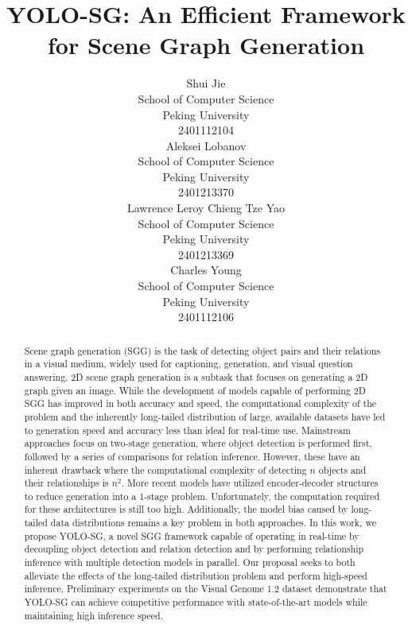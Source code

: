 \documentclass{article}
\title{YOLO-SG: An Efficient Framework for Scene Graph Generation}
\author{
  Shui Jie \\
  School of Computer Science\\
  Peking University\\
  2401112104 \\
  \And
  Aleksei Lobanov \\
  School of Computer Science\\
  Peking University\\
  2401213370  \\
  \AND
  Lawrence Leroy Chieng Tze Yao \\
  School of Computer Science\\
  Peking University\\
  2401213369\\
  \And
  Charles Young \\
  School of Computer Science\\
  Peking University\\
  2401112106
}
\begin{document}
\maketitle


\begin{abstract}
    Scene graph generation (SGG) is the task of detecting object pairs and their relations in a visual medium, widely used for captioning, generation, and visual question answering. 2D scene graph generation is a subtask that focuses on generating a 2D graph given an image. While the development of models capable of performing 2D SGG has improved in both accuracy and speed, the computational complexity of the problem and the inherently long-tailed distribution of large, available datasets have led to generation speed and accuracy less than ideal for real-time use. Mainstream approaches focus on two-stage generation, where object detection is performed first, followed by a series of comparisons for relation inference. However, these have an inherent drawback where the computational complexity of detecting $n$ objects and their relationships is $n^2$. More recent models have utilized encoder-decoder structures to reduce generation into a 1-stage problem. Unfortunately, the computation required for these architectures is still too high. Additionally, the model bias caused by long-tailed data distributions remains a key problem in both approaches. In this work, we propose YOLO-SG, a novel SGG framework capable of operating in real-time by decoupling object detection and relation detection and by performing relationship inference with multiple detection models in parallel. Our proposal seeks to both alleviate the effects of the long-tailed distribution problem and perform high-speed inference. Preliminary experiments on the Visual Genome 1.2 dataset demonstrate that YOLO-SG can achieve competitive performance with state-of-the-art models while maintaining high inference speed.
\end{abstract}
\end{document}
